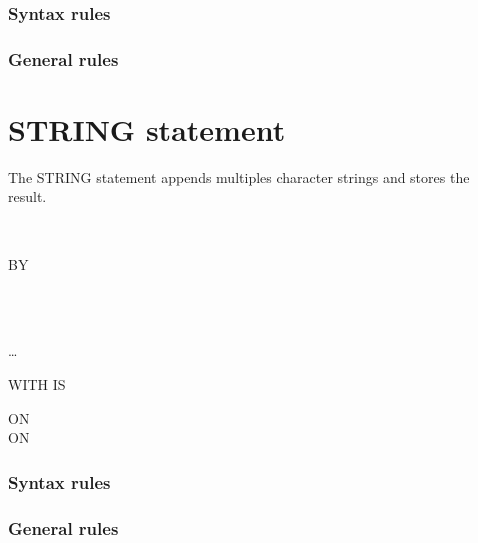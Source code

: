 \subsubsection{Syntax rules}

\subsubsection{General rules}

\section{STRING statement}

The STRING statement appends multiples character strings and stores the result.

\begin{syntax}
  \begin{1=}
    \begin{1=}
      \identifier \\
      \literal
    \end{1=}

    \begin{0-1}
       BY
      \begin{1=}
         \\
        \identifier \\
        \literal
      \end{1=}
    \end{0-1}
  \end{1=} \ldots\ {}
   \identifier

  \begin{0-1}
    WITH  IS \identifier
  \end{0-1}

  \begin{0+}
    ON  \imperativestatement \\
     ON  \imperativestatement
  \end{0+}
\end{syntax}

\subsubsection{Syntax rules}

\subsubsection{General rules}

